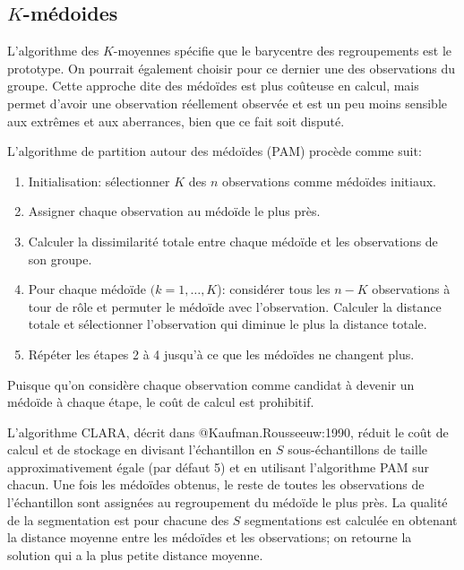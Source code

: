 \documentclass[
  11pt,
  letterpaper,
]{scrbook}
\providecommand{\tightlist}{%
  \setlength{\itemsep}{0pt}\setlength{\parskip}{0pt}}\usepackage{longtable,booktabs,array}
\theoremstyle{definition}
\theoremstyle{remark}
\begin{document}
\hypertarget{k-muxe9doides}{%
\subsection{\texorpdfstring{\(K\)-médoides}{K-médoides}}\label{k-muxe9doides}}

L'algorithme des \(K\)-moyennes spécifie que le barycentre des
regroupements est le prototype. On pourrait également choisir pour ce
dernier une des observations du groupe. Cette approche dite des médoïdes
est plus coûteuse en calcul, mais permet d'avoir une observation
réellement observée et est un peu moins sensible aux extrêmes et aux
aberrances, bien que ce fait soit disputé.

L'algorithme de partition autour des médoïdes (PAM) procède comme suit:

\begin{enumerate}
\def\labelenumi{\arabic{enumi}.}
\tightlist
\item
  Initialisation: sélectionner \(K\) des \(n\) observations comme
  médoïdes initiaux.
\item
  Assigner chaque observation au médoïde le plus près.
\item
  Calculer la dissimilarité totale entre chaque médoïde et les
  observations de son groupe.
\item
  Pour chaque médoïde \((k=1, \ldots, K\)): considérer tous les \(n-K\)
  observations à tour de rôle et permuter le médoïde avec l'observation.
  Calculer la distance totale et sélectionner l'observation qui diminue
  le plus la distance totale.
\item
  Répéter les étapes 2 à 4 jusqu'à ce que les médoïdes ne changent plus.
\end{enumerate}

Puisque qu'on considère chaque observation comme candidat à devenir un
médoïde à chaque étape, le coût de calcul est prohibitif.

L'algorithme CLARA, décrit dans @Kaufman.Rousseeuw:1990, réduit le coût
de calcul et de stockage en divisant l'échantillon en \(S\)
sous-échantillons de taille approximativement égale (par défaut 5) et en
utilisant l'algorithme PAM sur chacun. Une fois les médoïdes obtenus, le
reste de toutes les observations de l'échantillon sont assignées au
regroupement du médoïde le plus près. La qualité de la segmentation est
pour chacune des \(S\) segmentations est calculée en obtenant la
distance moyenne entre les médoïdes et les observations; on retourne la
solution qui a la plus petite distance moyenne.
\end{document}
